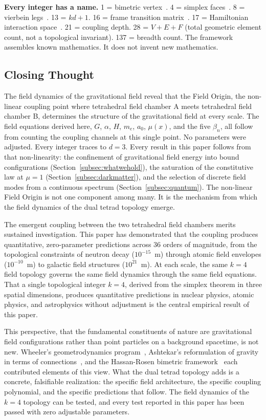 \documentclass[aps,prd,preprint,superscriptaddress,showpacs,preprintnumbers,amsmath,amssymb,nofootinbib]{revtex4-2}
\begin{document}
\textbf{Every integer has a name.} 1 = bimetric vertex~\cite{hinterbichler2012}. 4 = simplex faces~\cite{ziegler1995}. 8 = vierbein legs~\cite{barbieri1998}. 13 = $kd + 1$. 16 = frame transition matrix~\cite{hassan2012}. 17 = Hamiltonian interaction space~\cite{hassankocic2018}. 21 = coupling depth. 28 = $V + E + F$ (total geometric element count, not a topological invariant). 137 = breadth count. The framework assembles known mathematics. It does not invent new mathematics.

\subsection{Closing Thought}
\label{subsec:closing}

The field dynamics of the gravitational field reveal that the Field Origin, the non-linear coupling point where tetrahedral field chamber A meets tetrahedral field chamber B, determines the structure of the gravitational field at every scale. The field equations derived here, $G$, $\alpha$, $H$, $m_e$, $a_0$, $\mu(x)$, and the five $\beta_n$, all follow from counting the coupling channels at this single point. No parameters were adjusted. Every integer traces to $d = 3$. Every result in this paper follows from that non-linearity: the confinement of gravitational field energy into bound configurations (Section~\ref{subsec:whatwehold}), the saturation of the constitutive law at $\mu = 1$ (Section~\ref{subsec:darkmatter}), and the selection of discrete field modes from a continuous spectrum (Section~\ref{subsec:quantum}). The non-linear Field Origin is not one component among many. It is the mechanism from which the field dynamics of the dual tetrad topology emerge.

The emergent coupling between the two tetrahedral field chambers merits sustained investigation. This paper has demonstrated that the coupling produces quantitative, zero-parameter predictions across 36 orders of magnitude, from the topological constraints of neutron decay ($10^{-15}$~m) through atomic field envelopes ($10^{-10}$~m) to galactic field structures ($10^{21}$~m). At each scale, the same $k = 4$ field topology governs the same field dynamics through the same field equations. That a single topological integer $k = 4$, derived from the simplex theorem in three spatial dimensions, produces quantitative predictions in nuclear physics, atomic physics, and astrophysics without adjustment is the central empirical result of this paper.

This perspective, that the fundamental constituents of nature are gravitational field configurations rather than point particles on a background spacetime, is not new. Wheeler's geometrodynamics program~\cite{wheeler1955}, Ashtekar's reformulation of gravity in terms of connections~\cite{ashtekar1986}, and the Hassan-Rosen bimetric framework~\cite{hassan2012} each contributed elements of this view. What the dual tetrad topology adds is a concrete, falsifiable realization: the specific field architecture, the specific coupling polynomial, and the specific predictions that follow. The field dynamics of the $k = 4$ topology can be tested, and every test reported in this paper has been passed with zero adjustable parameters.
\end{document}
